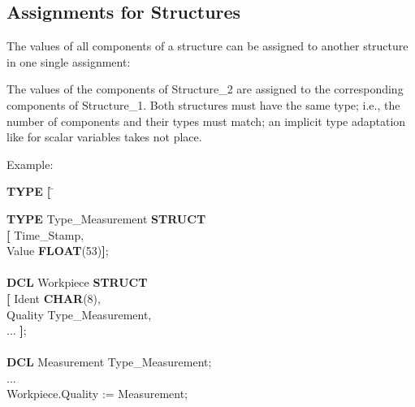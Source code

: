 \subsection{Assignments for Structures}   %

The values of all components of a structure can be assigned to another
structure in one single assignment:



The values of the components of Structure\_2 are assigned to the
corresponding components of Structure\_1. Both structures must have the same
type; i.e., the number of components and their types must match; an
implicit type adaptation like for scalar variables takes not place.

Example:

\begin{tabbing}
{\bf TYPE} \= {\bf [} \= \kill

{\bf TYPE} \>         \> Type\_Measurement {\bf STRUCT}\\
    \> {\bf [} \> Time\_Stamp, \\
    \>         \> Value {\bf FLOAT}(53){\bf ]};\\
    \>         \> \\
{\bf DCL}  \>         \> Workpiece {\bf STRUCT} \\
    \> {\bf [} \> Ident {\bf CHAR}(8),\\
    \>         \> Quality Type\_Measurement,\\
    \>         \> ... {\bf ]};\\
    \>         \> \\
{\bf DCL}  \>         \> Measurement Type\_Measurement;\\
...        \>         \> \\
Workpiece.Quality := Measurement;
\end{tabbing}

